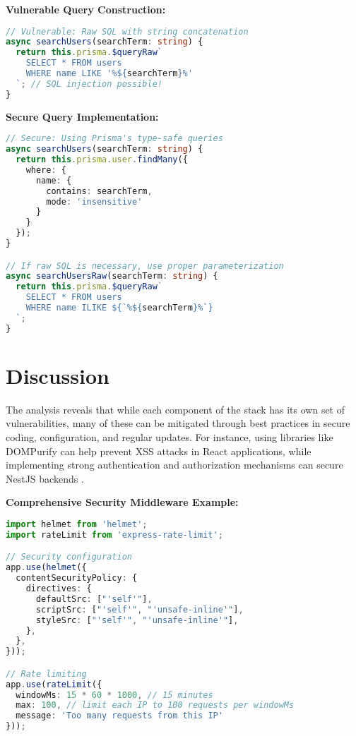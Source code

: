 \documentclass[conference]{IEEEtran}
\begin{document}
\textbf{Vulnerable Query Construction:}

\begin{lstlisting}[language=TypeScript, caption=Vulnerable raw SQL query in Prisma]
// Vulnerable: Raw SQL with string concatenation
async searchUsers(searchTerm: string) {
  return this.prisma.$queryRaw`
    SELECT * FROM users 
    WHERE name LIKE '%${searchTerm}%'
  `; // SQL injection possible!
}
\end{lstlisting}

\textbf{Secure Query Implementation:}

\begin{lstlisting}[language=TypeScript, caption=Secure Prisma query with proper parameterization]
// Secure: Using Prisma's type-safe queries
async searchUsers(searchTerm: string) {
  return this.prisma.user.findMany({
    where: {
      name: {
        contains: searchTerm,
        mode: 'insensitive'
      }
    }
  });
}

// If raw SQL is necessary, use proper parameterization
async searchUsersRaw(searchTerm: string) {
  return this.prisma.$queryRaw`
    SELECT * FROM users 
    WHERE name ILIKE ${`%${searchTerm}%`}
  `;
}
\end{lstlisting}

\section{Discussion}
The analysis reveals that while each component of the stack has its own set of vulnerabilities, many of these can be mitigated through best practices in secure coding, configuration, and regular updates. For instance, using libraries like DOMPurify can help prevent XSS attacks in React applications, while implementing strong authentication and authorization mechanisms can secure NestJS backends \cite{nestjsSec}. 

\textbf{Comprehensive Security Middleware Example:}

\begin{lstlisting}[language=TypeScript, caption=Security middleware implementation for NestJS]
import helmet from 'helmet';
import rateLimit from 'express-rate-limit';

// Security configuration
app.use(helmet({
  contentSecurityPolicy: {
    directives: {
      defaultSrc: ["'self'"],
      scriptSrc: ["'self'", "'unsafe-inline'"],
      styleSrc: ["'self'", "'unsafe-inline'"],
    },
  },
}));

// Rate limiting
app.use(rateLimit({
  windowMs: 15 * 60 * 1000, // 15 minutes
  max: 100, // limit each IP to 100 requests per windowMs
  message: 'Too many requests from this IP'
}));
\end{lstlisting}
\end{document}
